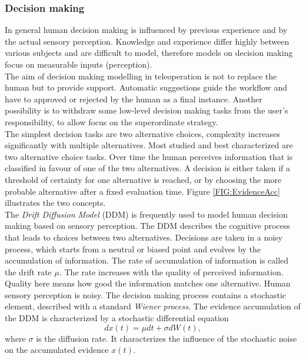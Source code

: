 \documentclass[a4paper,twoside, openright,12pt]{report}
\begin{document}
\subsubsection{Decision making}
In general human decision making is influenced by previous experience and by the actual sensory perception. Knowledge and experience differ highly between various subjects and are difficult to model, therefore models on decision making focus on measurable inputs (perception).\\
The aim of decision making modelling in teleoperation is not to replace the human but to provide support. Automatic suggestions guide the workflow and have to approved or rejected by the human as a final instance. Another possibility is to withdraw some low-level decision making tasks from the user's responsibility, to allow focus on the superordinate strategy.\\
The simplest decision tasks are two alternative choices, complexity increases significantly with multiple alternatives. Most studied and best characterized are two alternative choice tasks. Over time the human perceives information that is classified in favour of one of the two alternatives. A decision is either taken if a threshold of certainty for one alternative is reached, or by choosing the more probable alternative after a fixed evaluation time. Figure \ref{FIG:EvidenceAcc} illustrates the two concepts.\\
The \emph{Drift Diffusion Model} (DDM) is frequently used to model human decision making based on sensory perception. The DDM describes the cognitive process that leads to choices between two alternatives. Decisions are taken in a noisy process, which starts from a neutral or biased point and evolves by the accumulation of information. The rate of accumulation of information is called the drift rate $\mu$. The rate increases with the quality of perceived information. Quality here means how good the information matches one alternative. Human sensory perception is noisy. The decision making process contains a stochastic element, described with a standard \emph{Wiener process}. The evidence accumulation of the DDM is characterized by a stochastic differential equation 
\begin{equation}
dx(t) = \mu dt + \sigma dW(t),
\end{equation}  
where $\sigma$ is the diffusion rate. It characterizes the influence of the stochastic noise on the accumulated evidence $x(t)$.
\end{document}

